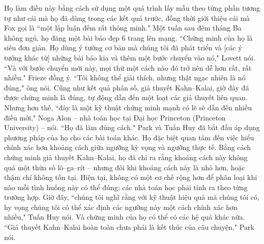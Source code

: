 \begin{multicols}{2}
	\vskip 0.1cm
	Họ làm điều này bằng cách sử dụng một quá trình lấy mẫu theo từng phần tương tự như cái mà họ đã dùng trong các kết quả trước, đồng thời giới thiệu cái mà Fox gọi là ``một lập luận đếm rất thông minh." Một tuần sau đêm tháng Ba không ngủ, họ đăng một bài báo đẹp $6$ trang lên mạng.
	\vskip 0.1cm
	``Chứng minh của họ là siêu đơn giản. Họ dùng ý tưởng cơ bản mà chúng tôi đã phát triển và [các ý tưởng khác từ] những bài báo kia và thêm một bước chuyển vào nó," Lovett nói. ``Và với bước chuyển mới này, mọi thứ một cách nào đó trở nên dễ hơn rất, rất nhiều."
	\vskip 0.1cm
	Frieze đồng ý. ``Tôi không thể giải thích, nhưng thật ngạc nhiên là nó đúng," ông nói.
	\vskip 0.1cm
	Cũng như kết quả phân số, giả thuyết Kahn--Kalai, giờ đây đã được chứng minh là đúng, tự động dẫn đến một loạt các giả thuyết liên quan. Nhưng hơn thế, ``đây là một kỹ thuật chứng minh mạnh có lẽ sẽ dẫn đến nhiều điều mới,"  Noga Alon -- nhà toán học tại Đại học Princeton (Princeton University) -- nói. ``Họ đã làm đúng cách."
	\vskip 0.1cm
	Park và Tuấn Huy đã bắt đầu áp dụng phương pháp của họ cho các bài toán khác. Họ đặc biệt quan tâm đến việc hiểu chính xác hơn khoảng cách giữa ngưỡng kỳ vọng và ngưỡng thực tế. Bằng cách chứng minh giả thuyết Kahn--Kalai, họ đã chỉ ra  rằng khoảng cách này không quá một thừa số lô--ga--rít  -- nhưng đôi khi khoảng cách này là nhỏ hơn, hoặc thậm chí không tồn tại. Hiện tại, không có một cơ chế rộng hơn để phân loại khi nào mỗi tình huống này có thể đúng; các nhà toán học phải tính ra theo từng trường hợp. Giờ đây, ``chúng tôi nghĩ rằng với kỹ thuật hiệu quả mà chúng tôi có, hy vọng chúng tôi  có thể xác định các ngưỡng này một cách chính xác hơn nhiều," Tuấn Huy nói.
	\vskip 0.1cm
	Và chứng minh của họ có thể có các hệ quả khác nữa. ``Giả thuyết Kahn--Kalai  hoàn toàn chưa phải  là kết thúc của câu chuyện," Park nói.
	\vskip 0.2cm
\end{multicols}
